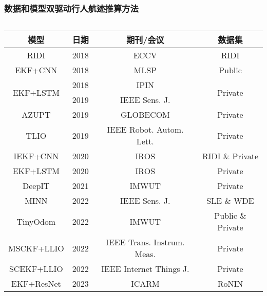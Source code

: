 \begin{frame}
	\frametitle{数据和模型双驱动行人航迹推算方法}
	\begin{columns}[t]
		\begin{column}{0.5\textwidth}
		{
		    \tiny
		    \setlength{\tabcolsep}{2pt}
			\begin{tabular*}{\linewidth}{@{\extracolsep{\fill}}cccc}
				\toprule
				\multicolumn{1}{c}{模型} & 日期 & 期刊/会议 & 数据集 \\
				\midrule
				    \rowcolor{gray!50} RIDI & 2018 & ECCV                            & RIDI                     \\
				                    EKF+CNN & 2018 & MLSP                            & Public                    \\
				  \multirow{2}{*}{EKF+LSTM} & 2018 & IPIN                            & \multirow{2}{*}{Private} \\
				                            & 2019 & IEEE Sens. J.                   &                          \\
				                      AZUPT & 2019 & GLOBECOM                        & Private                  \\	
				    \rowcolor{gray!50} TLIO & 2019 & IEEE Robot. Autom. Lett.        & Private                  \\
				\rowcolor{gray!50} IEKF+CNN & 2020 & IROS                            & RIDI \& Private          \\
				                   EKF+LSTM & 2020 & IROS                            & Private                  \\
				                     DeepIT & 2021 & IMWUT                           & Private                  \\
				                       MINN & 2022 & IEEE Sens. J.                   & SLE \& WDE               \\
				                   TinyOdom & 2022 & IMWUT                           & Public \& Private        \\
				                 MSCKF+LLIO & 2022 & IEEE Trans. Instrum. Meas.      & Private                  \\
				                 SCEKF+LLIO & 2022 & IEEE Internet Things J.         & Private                  \\
				                 EKF+ResNet & 2023 & ICARM                           & RoNIN                    \\
				\bottomrule
			\end{tabular*}          
		}

\end{column}
\end{columns}
\end{frame}
